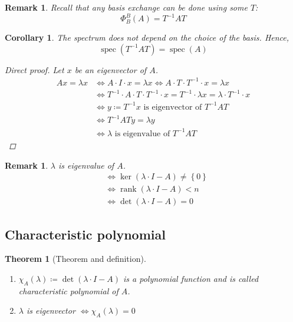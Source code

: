 \documentclass{article}
\newcounter{lecref}[section]
\numberwithin{lecref}{section}
\newtheorem{theorem}[lecref]{Theorem}
\newtheorem{remark}[lecref]{Remark}
\newtheorem{corollary}[lecref]{Corollary}
\newcommand{\set}[1]{\left\{#1\right\}}
\DeclareMathOperator{\rank}{rank}
\begin{document}
\begin{remark}
  Recall that any basis exchange can be done using some $T$:
  \[ \Phi_B^B(A) = T^{-1} A T \]
\end{remark}

\begin{corollary}
  The spectrum does not depend on the choice of the basis. Hence,
  \[ \operatorname{spec}(T^{-1} AT) = \operatorname{spec}(A) \]

  \begin{proof}[Direct proof]
    Let $x$ be an eigenvector of $A$.
    \begin{align*}
      Ax = \lambda x &\iff A \cdot I \cdot x = \lambda x \iff A \cdot T \cdot T^{-1} \cdot x = \lambda x \\
                     &\iff T^{-1} \cdot A \cdot T \cdot T^{-1} \cdot x = T^{-1} \cdot \lambda x = \lambda \cdot T^{-1} \cdot x \\
                     &\iff y \coloneqq T^{-1} x \text{ is eigenvector of } T^{-1} AT \\
                     &\iff T^{-1} AT y = \lambda y \\
                     &\iff \lambda \text{ is eigenvalue of } T^{-1} AT
    \end{align*}
  \end{proof}
\end{corollary}

\begin{remark}
  $\lambda$ is eigenvalue of $A$.
  \begin{align*}
    &\iff \ker(\lambda \cdot I - A) \neq \set{0} \\
    &\iff \rank(\lambda \cdot I - A) < n \\
    &\iff \det(\lambda \cdot I - A) = 0
  \end{align*}
\end{remark}

\subsection{Characteristic polynomial}

\begin{theorem}[Theorem and definition] \hfill{} %
  \begin{enumerate}
    \item $\chi_A(\lambda) \coloneqq \det(\lambda \cdot I - A)$ is a polynomial function and is called \emph{characteristic polynomial of $A$}.
    \item $\lambda$ is eigenvector $\iff \chi_A(\lambda) = 0$
  \end{enumerate}
\end{theorem}
\end{document}
